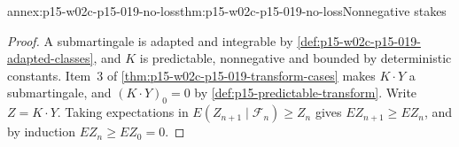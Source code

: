 \begin{annexitem}{annex:p15-w02c-p15-019-no-loss}{thm:p15-w02c-p15-019-no-loss}{Nonnegative stakes}
\begin{proof}
A submartingale is adapted and integrable by
\cref{def:p15-w02c-p15-019-adapted-classes}, and \(K\) is predictable,
nonnegative and bounded by deterministic constants. Item~3 of
\cref{thm:p15-w02c-p15-019-transform-cases} makes \(K\cdot Y\) a
submartingale, and \((K\cdot Y)_0=0\) by
\cref{def:p15-predictable-transform}. Write \(Z=K\cdot Y\). Taking
expectations in \(E(Z_{n+1}\mid\mathcal F_n)\geq Z_n\) gives
\(EZ_{n+1}\geq EZ_n\), and by induction \(EZ_n\geq EZ_0=0\).
\end{proof}
\end{annexitem}
